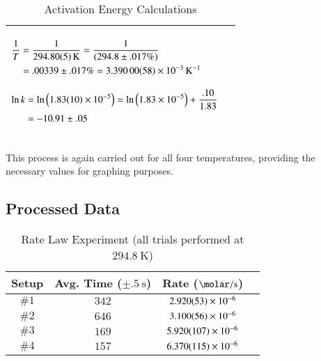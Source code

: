 \begin{table}[h!]
\begin{tabularx}{\textwidth}{|X|X|}
{$\!\begin{aligned}
	\frac{1}{T} &= \frac{1}{\SI{294.8 \pm .05}{\kelvin}} = \frac{1}{(294.8 \pm .017\%)} \\
	&=  .00339 \pm .017\% = \SI{3.39\pm.00058e-3}{\per\kelvin}
	\end{aligned}$} 

\rule{0pt}{3ex}   

{$\!\begin{aligned}
	\ln{k} &= \ln{\left(\num{1.83\pm.10e-5}\right)} = \ln{\left(\num{1.83e-5}\right)} + \frac{.10}{1.83} \\
	&= -10.91 \pm .05
	\end{aligned}$} \\

\hline
\end{tabularx}
\caption{Activation Energy Calculations}
\label{table:activation_energy_calculations}
\end{table}

This process is again carried out for all four temperatures, providing the necessary values for graphing purposes.

\subsection{Processed Data}

\begin{table}[!htb]
\centering
	\begin{tabular}{|c|c|c|c|} 
		 \hline
		 Setup & Avg. Time ($\pm \SI{.5}{\second}$) & Rate ($\si{\molar\per\second}$) \\
		 \hline
		  $\#1$ & $342$ & $\num{2.92\pm.053e-6}$\\
		  \hline
		  $\#2$ & $646$ & $\num{3.10\pm.056e-6}$\\
		  \hline
		  $\#3$ & $169$ & $\num{5.92\pm.107e-6}$\\
		  \hline
		  $\#4$ & $157$ & $\num{6.37\pm.115e-6}$ \\
		  \hline
		 \end{tabular}
		\caption{Rate Law Experiment (all trials performed at $\SI{294.8}{\kelvin}$)}
	\label{table:rate_law_processed_data}
\end{table}


